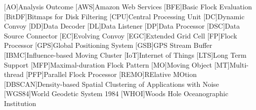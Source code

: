 \begin{acronym}[ACRONYM]
[AO]{Analysis Outcome}
[AWS]{Amazon Web Services}
[BFE]{Basic Flock Evaluation}
[BitDF]{Bitmaps for Disk Filtering}
[CPU]{Central Processing Unit}
[DC]{Dynamic Convoy}
[DD]{Data Decoder}
[DL]{Data Listener}
[DP]{Data Processor}
[DSC]{Data Source Connector}
[EC]{Evolving Convoy}
[EGC]{Extended Grid Cell}
[FP]{Flock Processor}
[GPS]{Global Positioning System}
[GSB]{GPS Stream Buffer}
[IBMC]{Influence-based Moving Cluster}
[IoT]{Internet of Things}
[LTS]{Long Term Support}
[MFP]{Maximal-duration Flock Pattern}
[MO]{Moving Object}
[MT]{Multi-thread}
[PFP]{Parallel Flock Processor}
[REMO]{RElative MOtion}
[DBSCAN]{Density-based Spatial Clustering of Applications with Noise}
[WGS84]{World Geodetic System 1984}
[WHOI]{Woods Hole Oceanographic Institution}
\end{acronym}
